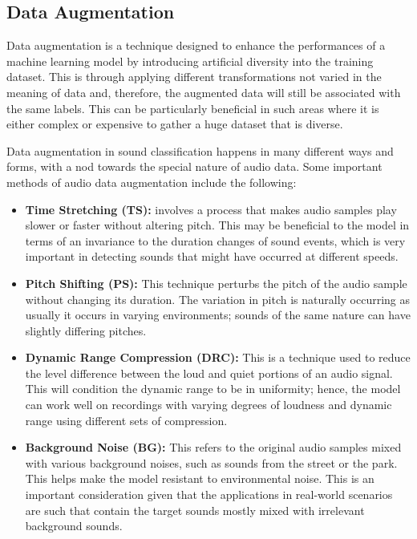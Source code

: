 \subsection{Data Augmentation}
Data augmentation is a technique designed to enhance the performances of a machine learning model by introducing artificial diversity into the training dataset. This is through applying different transformations not varied in the meaning of data and, therefore, the augmented data will still be associated with the same labels. This can be particularly beneficial in such areas where it is either complex or expensive to gather a huge dataset that is diverse. \cite{salamon_deep_2017}

Data augmentation in sound classification happens in many different ways and forms, with a nod towards the special nature of audio data. Some important methods of audio data augmentation include the following:

\begin{itemize}
    \item \textbf{Time Stretching (TS):}
    involves a process that makes audio samples play slower or faster without altering pitch. This may be beneficial to the model in terms of an invariance to the duration changes of sound events, which is very important in detecting sounds that might have occurred at different speeds.\cite{salamon_deep_2017}

    \item \textbf{Pitch Shifting (PS):} 
    This technique perturbs the pitch of the audio sample without changing its duration. The variation in pitch is naturally occurring as usually it occurs in varying environments; sounds of the same nature can have slightly differing pitches. \cite{salamon_deep_2017}
    
    \item \textbf{Dynamic Range Compression (DRC):} 
    This is a technique used to reduce the level difference between the loud and quiet portions of an audio signal. This will condition the dynamic range to be in uniformity; hence, the model can work well on recordings with varying degrees of loudness and dynamic range using different sets of compression.\cite{salamon_deep_2017}
    
    \item \textbf{Background Noise (BG):} 
    This refers to the original audio samples mixed with various background noises, such as sounds from the street or the park. This helps make the model resistant to environmental noise. This is an important consideration given that the applications in real-world scenarios are such that contain the target sounds mostly mixed with irrelevant background sounds.\cite{salamon_deep_2017}
\end{itemize}
    
